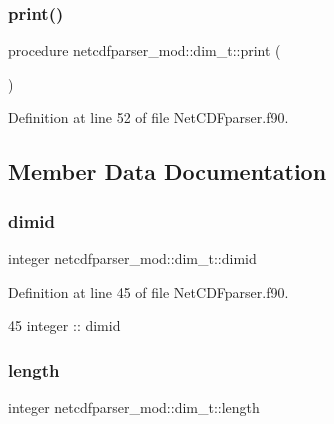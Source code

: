 \subsubsection{\texorpdfstring{print()}{print()}}
{\footnotesize\ttfamily procedure netcdfparser\+\_\+mod\+::dim\+\_\+t\+::print (\begin{DoxyParamCaption}{ }\end{DoxyParamCaption})\hspace{0.3cm}{\ttfamily [private]}}



Definition at line 52 of file Net\+C\+D\+Fparser.\+f90.



\subsection{Member Data Documentation}
\mbox{\label{structnetcdfparser__mod_1_1dim__t_ae0eee1b309e61daefc73868795c35cc9}} 
\subsubsection{\texorpdfstring{dimid}{dimid}}
{\footnotesize\ttfamily integer netcdfparser\+\_\+mod\+::dim\+\_\+t\+::dimid\hspace{0.3cm}{\ttfamily [private]}}



Definition at line 45 of file Net\+C\+D\+Fparser.\+f90.


\begin{DoxyCode}
45         \textcolor{keywordtype}{integer} :: dimid
\end{DoxyCode}
\mbox{\label{structnetcdfparser__mod_1_1dim__t_ad099f35ecc70f2370e69eddfa21235dd}} 
\subsubsection{\texorpdfstring{length}{length}}
{\footnotesize\ttfamily integer netcdfparser\+\_\+mod\+::dim\+\_\+t\+::length\hspace{0.3cm}{\ttfamily [private]}}




